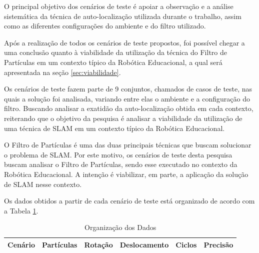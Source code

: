 
O principal objetivo dos cenários de teste é apoiar a observação e a análise sistemática da técnica de auto-localização utilizada durante o trabalho, assim como as diferentes configurações do ambiente e
do filtro utilizado.

Após a realização de todos os cenários de teste propostos, foi possível chegar a uma conclusão quanto à viabilidade da utilização da técnica do Filtro de Partículas em um contexto típico da Robótica Educacional, a qual
será apresentada na seção \ref{sec:viabilidade}.

Os cenários de teste fazem parte de 9 conjuntos, chamados de casos de teste, nas quais a solução foi analisada, variando entre elas o ambiente e a configuração do filtro. Buscando
analisar a exatidão da auto-localização obtida em cada contexto, reiterando que o objetivo da pesquisa é analisar a viabilidade da utilização
de uma técnica de SLAM em um contexto típico da Robótica Educacional.

O Filtro de Partículas é uma das duas principais técnicas que buscam solucionar o problema
de SLAM. Por este motivo, os cenários de teste desta pesquisa buscam analisar o Filtro de Partículas, sendo esse executado no contexto da Robótica Educacional.
A intenção é viabilizar, em parte, a aplicação da solução de SLAM nesse contexto.

Os dados obtidos a partir de cada cenário de teste está organizado de acordo com a Tabela \ref{tab:org_dados}.

\begin{table}[H]
  \centering
  \caption{Organização dos Dados}
  \label{tab:org_dados}
  \begin{tabular}{|c|c|c|c|c|c|}
  \hline
  \textbf{Cenário} & \textbf{Partículas} & \textbf{Rotação} & \textbf{Deslocamento} & \textbf{Ciclos} & \textbf{Precisão} \\ \hline
  \end{tabular}
\end{table}

